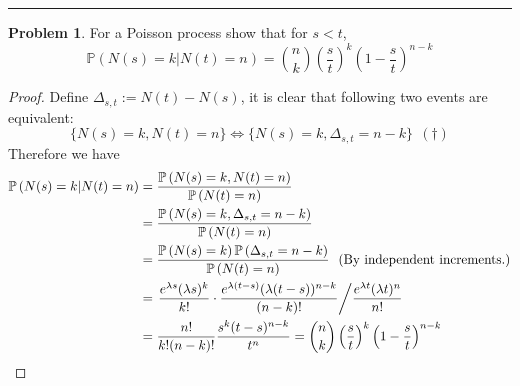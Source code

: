 \documentclass[a4paper, 10pt]{article}
\theoremstyle{definition}
\newtheorem{problem}{Problem}
\theoremstyle{hSol}
\begin{document}
\noindent\rule{16cm}{0.4pt}
\begin{problem} For a Poisson process show that for $s<t$,
$$
\mathbb{P}\left(N(s)=k|N(t)=n\right) = \binom{n}{k}\left(\frac{s}{t}\right)^k \left(1-\frac{s}{t}\right)^{n-k}
$$
\end{problem}
\begin{proof} Define $\Delta_{s,t}:=N(t)-N(s)$, it is clear that following two events are equivalent:
$$\{N(s)=k, N(t)=n\} \iff \{N(s)=k, \Delta_{s,t}=n-k\}~~(\dag)$$
Therefore we have
\begin{equation}
  \begin{split}
    \mathbb{P}\left(N(s)=k|N(t)=n\right) &= \frac{\mathbb{P}\left(N(s)=k, N(t)=n\right)}{\mathbb{P}\left(N(t)=n\right)}
    \\
    &= \frac{\mathbb{P}\left(N(s)=k, \Delta_{s,t}=n-k\right)}{\mathbb{P}\left(N(t)=n\right)}\\
    &= \frac{\mathbb{P}\left(N(s)=k\right)\mathbb{P}\left(\Delta_{s,t}=n-k\right)}{\mathbb{P}\left(N(t)=n\right)}~~(\text{By independent increments.})\\
    &= \left. \frac{e^{\lambda s}(\lambda s)^k}{k!}\cdot \frac{e^{\lambda (t-s)}(\lambda (t-s))^{n-k}}{(n-k)!} \middle/ \frac{e^{\lambda t}(\lambda t)^n}{n!} \right.\\
    &= \frac{n!}{k!(n-k)!}\frac{s^k (t-s)^{n-k}}{t^n} = \binom{n}{k}\left(\frac{s}{t}\right)^k \left(1-\frac{s}{t}\right)^{n-k}
  \end{split}
\end{equation}
\end{proof}
\end{document}
